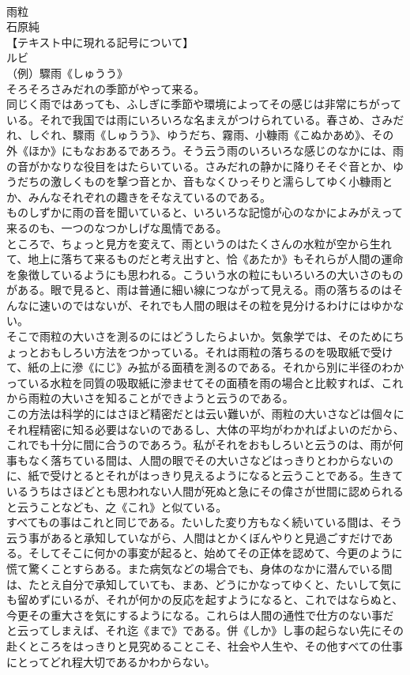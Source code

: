 \documentclass[8pt]{extreport}
\begin{document}
\begin{CJK}{UTF8}{min}
\\	雨粒
\\	石原純
\\	【テキスト中に現れる記号について】
\\	ルビ
\\	（例）驟雨《しゅうう》
\\	そろそろさみだれの季節がやって来る。
\\	同じく雨ではあっても、ふしぎに季節や環境によってその感じは非常にちがっている。それで我国では雨にいろいろな名まえがつけられている。春さめ、さみだれ、しぐれ、驟雨《しゅうう》、ゆうだち、霧雨、小糠雨《こぬかあめ》、その外《ほか》にもなおあるであろう。そう云う雨のいろいろな感じのなかには、雨の音がかなりな役目をはたらいている。さみだれの静かに降りそそぐ音とか、ゆうだちの激しくものを撃つ音とか、音もなくひっそりと濡らしてゆく小糠雨とか、みんなそれぞれの趣きをそなえているのである。
\\	ものしずかに雨の音を聞いていると、いろいろな記憶が心のなかによみがえって来るのも、一つのなつかしげな風情である。
\\	ところで、ちょっと見方を変えて、雨というのはたくさんの水粒が空から生れて、地上に落ちて来るものだと考え出すと、恰《あたか》もそれらが人間の運命を象徴しているようにも思われる。こういう水の粒にもいろいろの大いさのものがある。眼で見ると、雨は普通に細い線につながって見える。雨の落ちるのはそんなに速いのではないが、それでも人間の眼はその粒を見分けるわけにはゆかない。
\\	そこで雨粒の大いさを測るのにはどうしたらよいか。気象学では、そのためにちょっとおもしろい方法をつかっている。それは雨粒の落ちるのを吸取紙で受けて、紙の上に滲《にじ》み拡がる面積を測るのである。それから別に半径のわかっている水粒を同質の吸取紙に滲ませてその面積を雨の場合と比較すれば、これから雨粒の大いさを知ることができようと云うのである。
\\	この方法は科学的にはさほど精密だとは云い難いが、雨粒の大いさなどは個々にそれ程精密に知る必要はないのであるし、大体の平均がわかればよいのだから、これでも十分に間に合うのであろう。私がそれをおもしろいと云うのは、雨が何事もなく落ちている間は、人間の眼でその大いさなどはっきりとわからないのに、紙で受けとるとそれがはっきり見えるようになると云うことである。生きているうちはさほどとも思われない人間が死ぬと急にその偉さが世間に認められると云うことなども、之《これ》と似ている。
\\	すべてもの事はこれと同じである。たいした変り方もなく続いている間は、そう云う事があると承知していながら、人間はとかくぼんやりと見過ごすだけである。そしてそこに何かの事変が起ると、始めてその正体を認めて、今更のように慌て驚くことすらある。また病気などの場合でも、身体のなかに潜んでいる間は、たとえ自分で承知していても、まあ、どうにかなってゆくと、たいして気にも留めずにいるが、それが何かの反応を起すようになると、これではならぬと、今更その重大さを気にするようになる。これらは人間の通性で仕方のない事だと云ってしまえば、それ迄《まで》である。併《しか》し事の起らない先にその赴くところをはっきりと見究めることこそ、社会や人生や、その他すべての仕事にとってどれ程大切であるかわからない。

\end{CJK}
\end{document}
